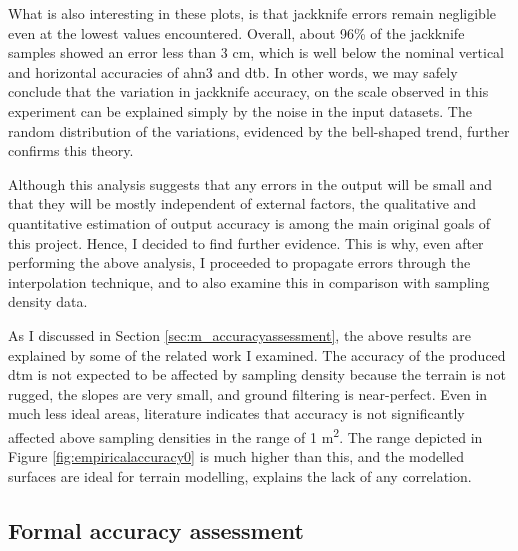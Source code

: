 What is also interesting in these plots, is that jackknife errors remain negligible even at the lowest values encountered. Overall, about 96\% of the jackknife samples showed an error less than 3 cm, which is well below the nominal vertical and horizontal accuracies of \ac{ahn3} and \ac{dtb}. In other words, we may safely conclude that the variation in jackknife accuracy, on the scale observed in this experiment can be explained simply by the noise in the input datasets. The random distribution of the variations, evidenced by the bell-shaped trend, further confirms this theory.

Although this analysis suggests that any errors in the output will be small and that they will be mostly independent of external factors, the qualitative and quantitative estimation of output accuracy is among the main original goals of this project. Hence, I decided to find further evidence. This is why, even after performing the above analysis, I proceeded to propagate errors through the interpolation technique, and to also examine this in comparison with sampling density data.

As I discussed in Section \ref{sec:m_accuracyassessment}, the above results are explained by some of the related work I examined. The accuracy of the produced \ac{dtm} is not expected to be affected by sampling density because the terrain is not rugged, the slopes are very small, and ground filtering is near-perfect. Even in much less ideal areas, literature indicates that accuracy is not significantly affected above sampling densities in the range of 1 m\textsuperscript{2}. The range depicted in Figure \ref{fig:empiricalaccuracy0} is much higher than this, and the modelled surfaces are ideal for terrain modelling, explains the lack of any correlation.

\subsection{Formal accuracy assessment}
\label{sub:accuracyformal}


